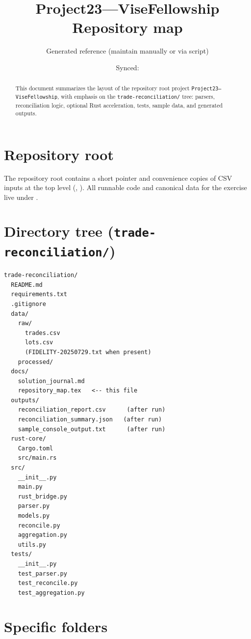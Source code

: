 \documentclass[11pt,a4paper]{article}
\title{Project23---ViseFellowship\\Repository map}
\author{Generated reference (maintain manually or via script)}
\date{Synced: \RepositorySyncDate}
\begin{document}
\maketitle

\begin{abstract}
\sloppy
This document summarizes the layout of the repository root project
\texttt{Project23---ViseFellowship}, with emphasis on the
\texttt{trade-reconciliation/} tree: parsers, reconciliation logic,
optional Rust acceleration, tests, sample data, and generated outputs.
\end{abstract}

\section{Repository root}

The repository root contains a short pointer  and convenience copies of CSV inputs at the top level (, ). All runnable code and canonical data for the exercise live under .

\section[Directory tree (trade-reconciliation)]{Directory tree (\texttt{trade-reconciliation/})}

\begin{verbatim}
trade-reconciliation/
  README.md
  requirements.txt
  .gitignore
  data/
    raw/
      trades.csv
      lots.csv
      (FIDELITY-20250729.txt when present)
    processed/
  docs/
    solution_journal.md
    repository_map.tex   <-- this file
  outputs/
    reconciliation_report.csv      (after run)
    reconciliation_summary.json   (after run)
    sample_console_output.txt      (after run)
  rust-core/
    Cargo.toml
    src/main.rs
  src/
    __init__.py
    main.py
    rust_bridge.py
    parser.py
    models.py
    reconcile.py
    aggregation.py
    utils.py
  tests/
    __init__.py
    test_parser.py
    test_reconcile.py
    test_aggregation.py
\end{verbatim}

\section{Specific folders}
\end{document}
